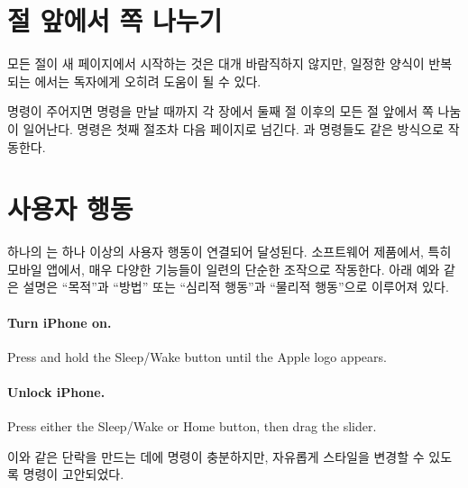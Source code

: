\documentclass[minted]{hzguide}
\begin{document}
\section{절 앞에서 쪽 나누기}

모든 절이 새 페이지에서 시작하는 것은 대개 바람직하지 않지만, 일정한 양식이 반복되는 에서는 독자에게 오히려 도움이 될 수 있다.

\begin{code}
\SectionNewpageOn*
\SectionNewpageOff
\SubsectionNewpageOn
\SubsectionNewpageOff
\end{code}

\macro{\SectionNewpageOn} 명령이 주어지면 \macro{\SectionNewpageOff} 명령을 만날 때까지 각 장에서 둘째 절 이후의 모든 절 앞에서 쪽 나눔이 일어난다.
\macro{\SectionNewpageOn*} 명령은 첫째 절조차 다음 페이지로 넘긴다.
\macro{\SubsectionNewpageOn}과 \macro{\SubsectionNewpageOff} 명령들도 같은 방식으로 작동한다.

\section{사용자 행동}

하나의 는 하나 이상의 사용자 행동이 연결되어 달성된다.
소프트웨어 제품에서, 특히 모바일 앱에서, 매우 다양한 기능들이 일련의 단순한 조작으로 작동한다.
아래 예와 같은 설명은 ``목적''과 ``방법'' 또는 ``심리적 행동''과 ``물리적 행동''으로 이루어져 있다.

\begin{example}
\vspace*{-1.5\onelineskip}
\paragraph{Turn iPhone on.} Press and hold the Sleep/Wake button until the Apple logo appears.
\paragraph{Unlock iPhone.} Press either the Sleep/Wake or Home button, then drag the slider.
\end{example}

\noindent 이와 같은 단락을 만드는 데에 \macro{\paragraph} 명령이 충분하지만, 자유롭게 스타일을 변경할 수 있도록 \macro{\action} 명령이 고안되었다.
\end{document}
